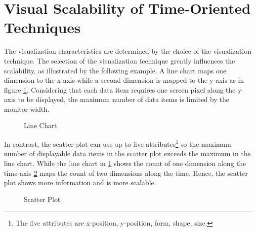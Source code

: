 \section{Visual Scalability of Time-Oriented Techniques}\label{visualization}
The visualization characteristics are determined by the choice of the visualization technique.
The selection of the visualization technique greatly influences the scalability, as illustrated by the following example. 
A line chart maps one dimension to the x-axis while a second dimension is mapped to the y-axis as in figure \ref{fig:linechart}. Considering that each data item requires one screen pixel along the y-axis to be displayed, the maximum number of data items is limited by the monitor width. 
\begin{figure}[H]
    \centering
    \caption[Line Chart]{Line Chart}
    \label{fig:linechart}
\end{figure}
 
In contrast, the scatter plot can use up to  five attributes\footnote{The five attributes are x-position, y-position, form, shape, size.} so the maximum number of displayable data items in the scatter plot exceeds the maximum in the line chart. While the line chart in \ref{fig:linechart} shows the count of one dimension along the time-axis \ref{fig:scatterplot} maps the count of two dimensions along the time. Hence, the scatter plot shows more information and is more scalable.
\begin{figure}[H]
    \centering
    \caption[Scatter Plot]{Scatter Plot}
    \label{fig:scatterplot}
\end{figure}

